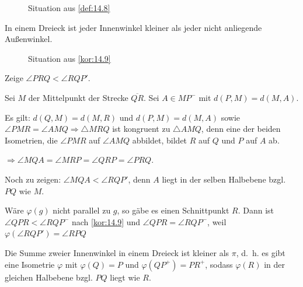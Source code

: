 \begin{figure}[ht]
    \centering
    \label{fig:def.14.8.0}
    \caption{Situation aus \cref{def:14.8}}
\end{figure}

\begin{bemerkung}\label{kor:14.9}%
    In einem Dreieck ist jeder Innenwinkel kleiner als jeder nicht 
    anliegende Außenwinkel.
\end{bemerkung}

\begin{figure}[htp]
    \centering
    
    \caption{Situation aus \cref{kor:14.9}}
    \label{fig:bem.14.9}
\end{figure}

\begin{beweis}
    Zeige $\angle PRQ < \angle RQP'$.

    Sei $M$ der Mittelpunkt der Strecke $\overline{QR}$. Sei
    $A \in MP^-$ mit $d(P,M) = d(M,A)$.

    Es gilt: $d(Q,M) = d(M,R)$ und $d(P,M) = d(M,A)$ sowie 
    $\angle PMR = \angle AMQ \Rightarrow \triangle MRQ$ ist
    kongruent zu $\triangle AMQ$, denn eine der beiden Isometrien, die
    $\angle PMR$ auf $\angle AMQ$ abbildet, bildet $R$ auf $Q$ und
    $P$ auf $A$ ab.

    $\Rightarrow \angle MQA = \angle MRP = \angle QRP = \angle PRQ$.

    Noch zu zeigen: $\angle MQA < \angle RQP'$, denn $A$ liegt in der
    selben Halbebene bzgl. $PQ$ wie $M$.
\end{beweis}

\begin{beweis}
    Wäre $\varphi(g)$ nicht parallel zu $g$, so gäbe es einen 
    Schnittpunkt $R$. Dann ist $\angle QPR < \angle RQP^-$ nach
    \cref{kor:14.9} und $\angle QPR = \angle RQP^-$, weil
    $\varphi(\angle RQP') = \angle RPQ$
\end{beweis}

\begin{folgerung}\label{folgerung:14.10}%
    Die Summe zweier Innenwinkel in einem Dreieck ist kleiner als
    $\pi$, d.~h. es gibt eine Isometrie $\varphi$ mit $\varphi(Q) = P$
    und $\varphi(QP^+) = PR^+$, sodass $\varphi(R)$ in der gleichen
    Halbebene bzgl. $PQ$ liegt wie $R$.
\end{folgerung}

